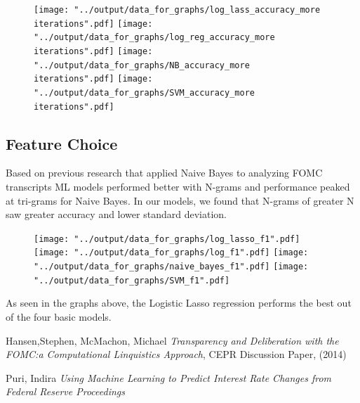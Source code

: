 \documentclass[11pt]{article}
\begin{document}
\begin{figure}[h!]
\begin{center}
\texttt{[image: "../output/data\_for\_graphs/log\_lass\_accuracy\_more iterations".pdf]}
\texttt{[image: "../output/data\_for\_graphs/log\_reg\_accuracy\_more iterations".pdf]}
\texttt{[image: "../output/data\_for\_graphs/NB\_accuracy\_more iterations".pdf]}
\texttt{[image: "../output/data\_for\_graphs/SVM\_accuracy\_more iterations".pdf]}
\end{center}
\end{figure}


\vspace{5cm}

\subsection{Feature Choice}

Based on previous research that applied Naive Bayes to analyzing FOMC transcripts \cite{stanford} ML models performed better with N-grams and performance peaked at tri-grams for Naive Bayes.  In our models, we found that N-grams of greater N saw greater accuracy and lower standard deviation.  


\begin{figure}[h!]
\begin{center}
\texttt{[image: "../output/data\_for\_graphs/log\_lasso\_f1".pdf]}
\texttt{[image: "../output/data\_for\_graphs/log\_f1".pdf]}
\texttt{[image: "../output/data\_for\_graphs/naive\_bayes\_f1".pdf]}
\texttt{[image: "../output/data\_for\_graphs/SVM\_f1".pdf]}
\end{center}
\end{figure}

As seen in the graphs above, the Logistic Lasso regression performs the best out of the four basic models.


 
\begin{thebibliography}{99}

 Hansen,Stephen, McMachon, Michael  \emph{Transparency and Deliberation with the FOMC:a Computational Linquistics Approach}, CEPR Discussion Paper, (2014)

 Puri, Indira \emph{Using Machine Learning to Predict Interest Rate Changes from Federal Reserve Proceedings}
\end{thebibliography}
\end{document}
